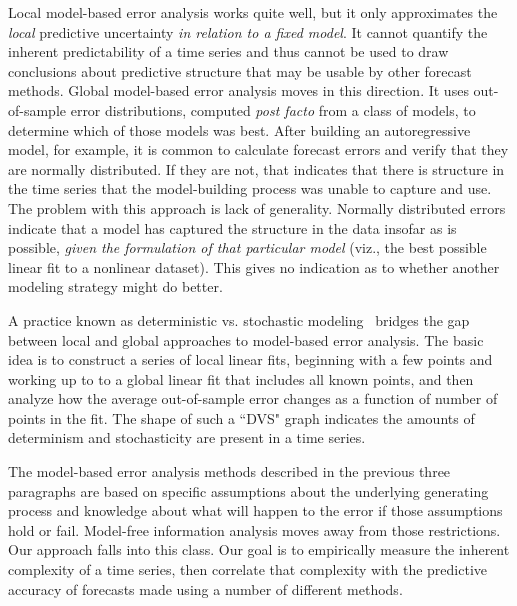 Local model-based error analysis works quite well, but it only
approximates the \emph{local} predictive uncertainty \emph{in relation
  to a fixed model}.  It cannot quantify the inherent predictability
of a time series and thus cannot be used to draw conclusions about
predictive structure that may be usable by other forecast methods.
%
%
Global model-based error analysis moves in this direction.  It uses
out-of-sample error distributions, computed \emph{post facto} from a
class of models, to determine which of those models was best.  After
building an autoregressive model, for example, it is common to
calculate forecast errors and verify that they are normally distributed.
If they are not, that indicates that there is structure in the time
series that the model-building process was unable to capture and use.
The problem with this approach is lack of generality.  
\label{page:normal-errors}
Normally distributed errors indicate that a model has captured the
structure in the data insofar as is possible, \emph{given the
  formulation of that particular model} (viz., the best possible
linear fit to a nonlinear dataset).  This gives no indication as to
whether another modeling strategy might do better.


A practice known as deterministic vs. stochastic
modeling~\cite{Casdagli92dvsplots, weigend-book} bridges the gap
between local and global approaches to model-based error analysis.
The basic idea is to construct a series of local linear fits,
beginning with a few points and working up to to a global linear fit
that includes all known points, and then analyze how the average
out-of-sample error changes as a function of number of points in the
fit. The shape of such a ``DVS" graph indicates the amounts of determinism
and stochasticity are present in a time series.

The model-based error analysis methods described in the previous three
paragraphs are based on specific assumptions about the underlying
generating process and knowledge about what will happen to the error
if those assumptions hold or fail.  Model-free information analysis
moves away from those restrictions.  Our approach falls into this
class.  Our goal is to empirically measure the inherent complexity of
a time series, then correlate that complexity with the predictive
accuracy of forecasts made using a number of different methods.  

